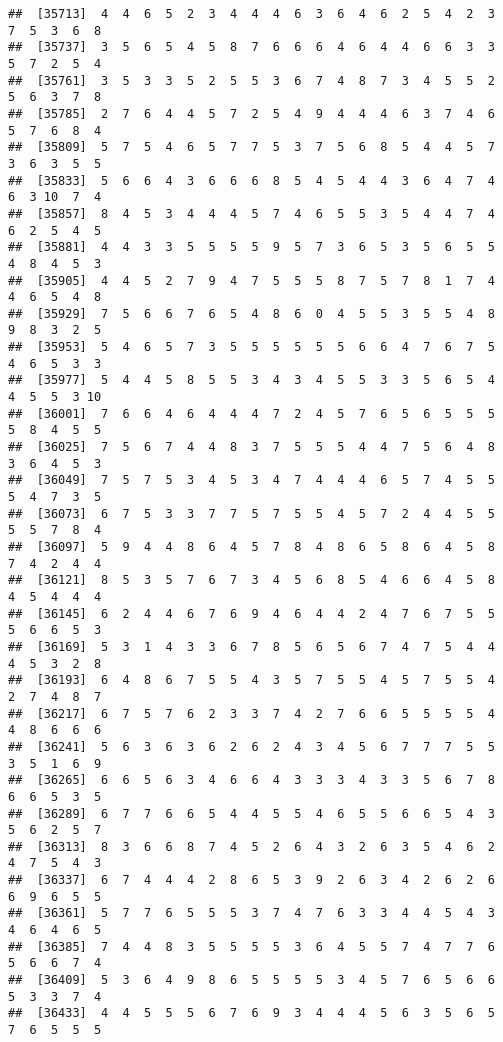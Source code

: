 \documentclass[
]{book}
\begin{document}
\begin{verbatim}
##  [35713]  4  4  6  5  2  3  4  4  4  6  3  6  4  6  2  5  4  2  3  7  5  3  6  8
##  [35737]  3  5  6  5  4  5  8  7  6  6  6  4  6  4  4  6  6  3  3  5  7  2  5  4
##  [35761]  3  5  3  3  5  2  5  5  3  6  7  4  8  7  3  4  5  5  2  5  6  3  7  8
##  [35785]  2  7  6  4  4  5  7  2  5  4  9  4  4  4  6  3  7  4  6  5  7  6  8  4
##  [35809]  5  7  5  4  6  5  7  7  5  3  7  5  6  8  5  4  4  5  7  3  6  3  5  5
##  [35833]  5  6  6  4  3  6  6  6  8  5  4  5  4  4  3  6  4  7  4  6  3 10  7  4
##  [35857]  8  4  5  3  4  4  4  5  7  4  6  5  5  3  5  4  4  7  4  6  2  5  4  5
##  [35881]  4  4  3  3  5  5  5  5  9  5  7  3  6  5  3  5  6  5  5  4  8  4  5  3
##  [35905]  4  4  5  2  7  9  4  7  5  5  5  8  7  5  7  8  1  7  4  4  6  5  4  8
##  [35929]  7  5  6  6  7  6  5  4  8  6  0  4  5  5  3  5  5  4  8  9  8  3  2  5
##  [35953]  5  4  6  5  7  3  5  5  5  5  5  5  6  6  4  7  6  7  5  4  6  5  3  3
##  [35977]  5  4  4  5  8  5  5  3  4  3  4  5  5  3  3  5  6  5  4  4  5  5  3 10
##  [36001]  7  6  6  4  6  4  4  4  7  2  4  5  7  6  5  6  5  5  5  5  8  4  5  5
##  [36025]  7  5  6  7  4  4  8  3  7  5  5  5  4  4  7  5  6  4  8  3  6  4  5  3
##  [36049]  7  5  7  5  3  4  5  3  4  7  4  4  4  6  5  7  4  5  5  5  4  7  3  5
##  [36073]  6  7  5  3  3  7  7  5  7  5  5  4  5  7  2  4  4  5  5  5  5  7  8  4
##  [36097]  5  9  4  4  8  6  4  5  7  8  4  8  6  5  8  6  4  5  8  7  4  2  4  4
##  [36121]  8  5  3  5  7  6  7  3  4  5  6  8  5  4  6  6  4  5  8  4  5  4  4  4
##  [36145]  6  2  4  4  6  7  6  9  4  6  4  4  2  4  7  6  7  5  5  5  6  6  5  3
##  [36169]  5  3  1  4  3  3  6  7  8  5  6  5  6  7  4  7  5  4  4  4  5  3  2  8
##  [36193]  6  4  8  6  7  5  5  4  3  5  7  5  5  4  5  7  5  5  4  2  7  4  8  7
##  [36217]  6  7  5  7  6  2  3  3  7  4  2  7  6  6  5  5  5  5  4  4  8  6  6  6
##  [36241]  5  6  3  6  3  6  2  6  2  4  3  4  5  6  7  7  7  5  5  3  5  1  6  9
##  [36265]  6  6  5  6  3  4  6  6  4  3  3  3  4  3  3  5  6  7  8  6  6  5  3  5
##  [36289]  6  7  7  6  6  5  4  4  5  5  4  6  5  5  6  6  5  4  3  5  6  2  5  7
##  [36313]  8  3  6  6  8  7  4  5  2  6  4  3  2  6  3  5  4  6  2  4  7  5  4  3
##  [36337]  6  7  4  4  4  2  8  6  5  3  9  2  6  3  4  2  6  2  6  6  9  6  5  5
##  [36361]  5  7  7  6  5  5  5  3  7  4  7  6  3  3  4  4  5  4  3  4  6  4  6  5
##  [36385]  7  4  4  8  3  5  5  5  5  3  6  4  5  5  7  4  7  7  6  5  6  6  7  4
##  [36409]  5  3  6  4  9  8  6  5  5  5  5  3  4  5  7  6  5  6  6  5  3  3  7  4
##  [36433]  4  4  5  5  5  6  7  6  9  3  4  4  4  5  6  3  5  6  5  7  6  5  5  5

\end{verbatim}
\end{document}
